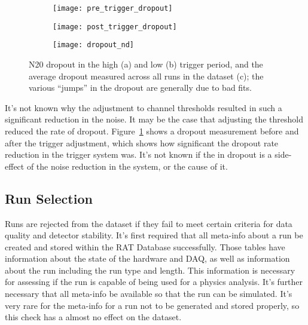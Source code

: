 \begin{figure}[htbp]
    \centering
    \begin{subfigure}[b]{0.48\textwidth}
        \centering
        \texttt{[image: pre\_trigger\_dropout]}
        \caption[]{}
    \end{subfigure}
    \hfill
    \begin{subfigure}[b]{0.48\textwidth}
        \centering
        \texttt{[image: post\_trigger\_dropout]}
        \caption[]{}
    \end{subfigure}

    \begin{subfigure}[b]{0.78\textwidth}
        \centering
        \texttt{[image: dropout\_nd]}
        \caption[]{}
    \end{subfigure}
    \caption[Dropout In Low and High Trigger Period]{
        N20 dropout in the high (a) and low (b) trigger period,
        and the average dropout measured across all runs in the
        dataset (c); the various ``jumps'' in the dropout are generally
        due to bad fits.}
    \label{fig:dataset_dropout}
\end{figure}

It's not known why the adjustment to channel thresholds resulted in such a significant
reduction in the noise.
It may be the case that adjusting the threshold reduced the rate of dropout.
Figure~\ref{fig:dataset_dropout} shows a dropout measurement before and after the trigger
adjustment, which shows how significant the dropout rate reduction in the trigger
system was.
It's not known if the in dropout is a side-effect of the noise reduction in
the system, or the cause of it.

\subsection{Run Selection}
\label{sec:run_selection}
Runs are rejected from the dataset if they fail to meet certain criteria
for data quality and detector stability.
It's first required that all meta-info about a run be created and stored
within the RAT Database successfully.
Those tables have information about the state of the hardware and DAQ, as
well as information about the run including the run type and length.
This information is necessary for assessing if the run is capable of being
used for a physics analysis.
It's further necessary that all meta-info be available so that the run
can be simulated.
It's very rare for the meta-info for a run not to be generated and stored
properly, so this check has a almost no effect on the dataset.

